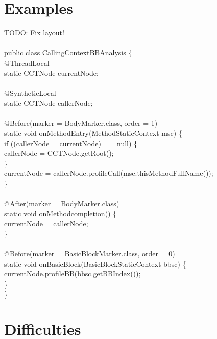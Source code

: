 \documentclass[a4paper]{report}
\begin{document}
\section{Examples}
TODO: Fix layout!\\
\\
public class CallingContextBBAnalysis \{\\
@ThreadLocal\\
static CCTNode currentNode;\\
\\
@SyntheticLocal\\
static CCTNode callerNode;\\
\\
@Before(marker = BodyMarker.class, order = 1)\\
static void onMethodEntry(MethodStaticContext msc) \{\\
if ((callerNode = currentNode) == null) \{\\
callerNode = CCTNode.getRoot();\\
\}\\
currentNode = callerNode.profileCall(msc.thisMethodFullName());\\
\}\\
\\
@After(marker = BodyMarker.class)\\
static void onMethodcompletion() \{\\
currentNode = callerNode;\\
\}\\
\\
@Before(marker = BasicBlockMarker.class, order = 0)\\
static void onBasicBlock(BasicBlockStaticContext bbsc) \{\\
currentNode.profileBB(bbsc.getBBIndex());\\
\}\\
\}

\section{Difficulties}
\end{document}
